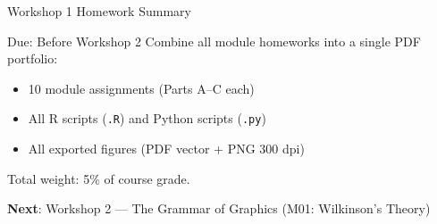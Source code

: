 \documentclass[10pt]{beamer}
\begin{document}
\begin{frame}{Workshop 1 Homework Summary}
  \begin{alertblock}{Due: Before Workshop 2}
    Combine all module homeworks into a single PDF portfolio:
    \begin{itemize}
      \item 10 module assignments (Parts A--C each)
      \item All R scripts (\texttt{.R}) and Python scripts (\texttt{.py})
      \item All exported figures (PDF vector + PNG 300 dpi)
    \end{itemize}
    Total weight: 5\% of course grade.
  \end{alertblock}

  \vspace{6pt}
  \textbf{Next}: Workshop 2 --- The Grammar of Graphics (M01: Wilkinson's Theory)
\end{frame}
\end{document}
